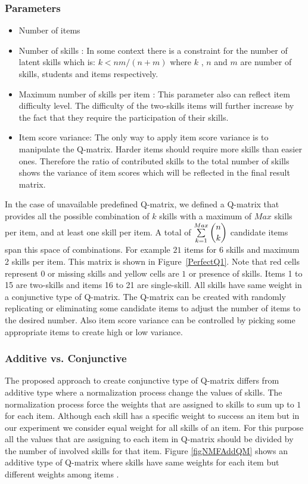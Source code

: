 \subsubsection{Parameters}
\begin{itemize}
\item Number of items 
\item Number of skills : In some context there is a constraint for the number of latent skills which is: $k<nm/(n+m)$ \protect\citep{lee1999learning} where $k$ , $n$ and $m$ are number of skills, students and items respectively.
\item Maximum number of skills per item : This parameter also can reflect item difficulty level. The difficulty of  the two-skills items will further increase by the fact that they require the participation of their skills.
\item Item score variance: The only way to apply item score variance is to manipulate the Q-matrix. Harder items should require more skills than easier ones. Therefore the ratio of contributed skills to the total number of skills shows the variance of item scores which will be reflected in the final result matrix.

\end{itemize}

In the case of unavailable predefined Q-matrix, we defined a Q-matrix that provides all the possible combination of $k$ skills with a maximum of $Max$ skills per item, and at least one skill per item. A total of $\sum\limits_{k=1}^{Max} \dbinom{n}{k}$ candidate items span this space of combinations. For example $21$ items for 6 skills and maximum 2 skills per item. This matrix is shown in Figure~\ref{PerfectQ1}. Note that red cells represent $0$ or missing skills and yellow cells are $1$ or presence of skills. Items 1 to 15 are two-skills and items 16 to 21 are single-skill. All skills have same weight in a conjunctive type of Q-matrix. The Q-matrix can be created with randomly replicating or eliminating some candidate items to adjust the number of items to the desired number. Also item score variance can be controlled by picking some appropriate items to create high or low variance.

\subsubsection{Additive vs. Conjunctive}
The proposed approach to create conjunctive type of Q-matrix differs from additive type where a normalization process change the values of skills. The normalization process force the weights that are assigned to skills to sum up to $1$ for each item. Although each skill has a specific weight to success an item but in our experiment we consider equal weight for all skills of an item. For this purpose all the values that are assigning to each item in Q-matrix should be divided by the number of involved skills for that item. Figure \ref{figNMFAddQM} shows an additive type of Q-matrix where skills have same weights for each item but different weights among items . 



